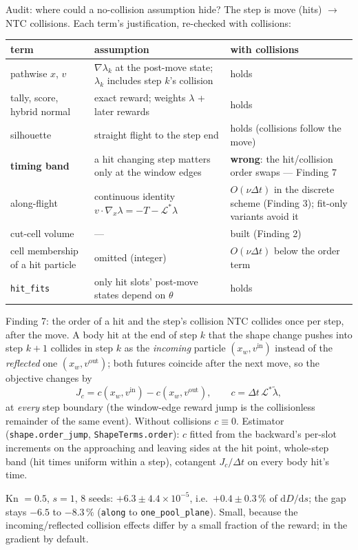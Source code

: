 \documentclass[10pt,aspectratio=169]{beamer}
\newcommand{\dd}{\mathrm{d}}
\newcommand{\code}[1]{\texttt{\small #1}}
\begin{document}
\begin{frame}{Audit: where could a no-collision assumption hide?}
\footnotesize
The step is move (hits) $\to$ NTC collisions.  Each term's justification, re-checked with collisions:

\medskip
\begin{tabular}{@{}p{3.2cm}p{5.6cm}p{3.6cm}@{}}
\toprule
term & assumption & with collisions\\
\midrule
pathwise $x$, $v$ & $\nabla\lambda_k$ at the post-move state; $\lambda_k$ includes step $k$'s collision & holds\\
tally, score, hybrid normal & exact reward; weights $\lambda$ + later rewards & holds\\
silhouette & straight flight to the step end & holds (collisions follow the move)\\
\textbf{timing band} & a hit changing step matters only at the window edges & \textbf{wrong}: the hit/collision order swaps --- Finding 7\\
along-flight & continuous identity $v\cdot\nabla_x\lambda = -T-\mathcal L^*\lambda$ & $O(\nu\Delta t)$ in the discrete scheme (Finding 3); fit-only variants avoid it\\
cut-cell volume & --- & built (Finding 2)\\
cell membership of a hit particle & omitted (integer) & $O(\nu\Delta t)$ below the order term\\
\code{hit\_fits} & only hit slots' post-move states depend on $\theta$ & holds\\
\bottomrule
\end{tabular}
\end{frame}

\begin{frame}{Finding 7: the order of a hit and the step's collision}
NTC collides once per step, after the move.  A body hit at the end of step $k$ that the
shape change pushes into step $k+1$ collides in step $k$ as the \emph{incoming} particle
$(x_w, v^{\mathrm{in}})$ instead of the \emph{reflected} one $(x_w, v^{\mathrm{out}})$; both futures
coincide after the next move, so the objective changes by
\[
J_c = c(x_w, v^{\mathrm{in}}) - c(x_w, v^{\mathrm{out}}),\qquad c = \Delta t\,\mathcal L^*\tilde\lambda ,
\]
at \emph{every} step boundary (the window-edge reward jump is the collisionless remainder of the
same event).  Without collisions $c \equiv 0$.  Estimator (\code{shape.order\_jump},
\code{ShapeTerms.order}): $c$ fitted from the backward's per-slot increments on the approaching
and leaving sides at the hit point, whole-step band (hit times uniform within a step),
cotangent $J_c/\Delta t$ on every body hit's time.

\medskip
Kn $=0.5$, $s = 1$, 8 seeds: $+6.3\pm4.4\times10^{-5}$, i.e.\ $+0.4\pm0.3\,\%$ of $\dd D/\dd s$; the gap
stays $-6.5$ to $-8.3\,\%$ (\code{along} to \code{one\_pool\_plane}).  Small, because the incoming/reflected collision effects
differ by a small fraction of the reward; in the gradient by default.
\end{frame}
\end{document}
